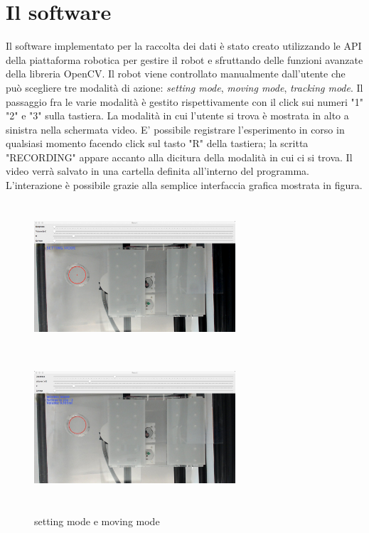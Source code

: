 \section{Il software}
Il software implementato per la raccolta dei dati è stato creato utilizzando le API della piattaforma robotica per gestire il robot e sfruttando delle funzioni avanzate della libreria OpenCV. Il robot viene controllato manualmente dall'utente che può scegliere tre modalità di azione: \emph{setting mode}, \emph{moving mode}, \emph{tracking mode}. Il passaggio fra le varie modalità è gestito rispettivamente con il click sui numeri "1" "2" e "3" sulla tastiera. La modalità in cui l'utente si trova è mostrata in alto a sinistra nella schermata video. E' possibile registrare l'esperimento in corso in qualsiasi momento facendo click sul tasto "R" della tastiera; la scritta "RECORDING" appare accanto alla dicitura della modalità in cui ci si trova. Il video verrà salvato in una cartella definita all'interno del programma.
L'interazione è possibile grazie alla semplice interfaccia grafica mostrata in figura.
\begin{figure}[h]
	\centering
   		{\includegraphics[width=7.5cm, height=5.5cm]{immagini/settingMOD2.jpg}}
 	\hspace{2mm}
   		{\includegraphics[width=7.5cm, height=5.5cm]{immagini/moving.jpg}}
	\caption{setting mode e moving mode}
 	\end{figure}
